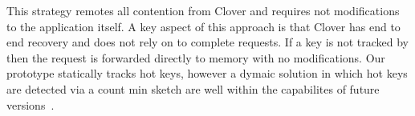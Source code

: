 This strategy remotes all contention from Clover and
requires not modifications to the application itself. A key
aspect of this approach is that Clover has end to end
recovery and does not rely on \sword to complete requests.
If a key is not tracked by \sword then the request is
forwarded directly to memory with no modifications. Our
prototype statically tracks hot keys, however a dymaic
solution in which hot keys are detected via a count min
sketch are well within the capabilites of future
versions~\cite{switchml}.